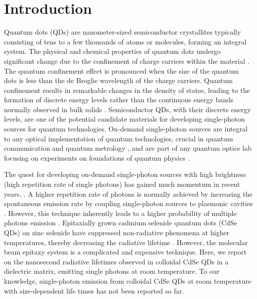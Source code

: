 \documentclass[%
 aip,
 amsmath,amssymb,
 reprint,%
]{revtex4-1}
\begin{document}
\section{\label{sec:level1}Introduction}
 Quantum dots (QDs) are nanometer-sized semiconductor crystallites typically consisting of tens to a few thousands of atoms or molecules,  forming an integral system. The physical \cite{CC, DD, EE} and chemical\cite{AA, BB} properties  of quantum dots undergo significant change due to the confinement of charge carriers within the material \cite{AAM}. The quantum confinement effect is pronounced when the size of the quantum dots is less than the de Broglie wavelength of the charge carriers. Quantum confinement results in remarkable changes in the density of states, leading to the formation of discrete energy levels rather than the continuous energy bands normally observed in bulk solids \cite{AAO}. Semiconductor QDs, with their discrete energy levels, are one of the potential candidate materials for developing single-photon sources for quantum technologies. On-demand single-photon sources are integral to any optical implementation of quantum technologies, crucial in quantum communication\cite{AAG} and quantum metrology \cite{AAH}, and are part of any quantum optics lab focusing on experiments on foundations of quantum physics \cite{AAI}.

The quest for developing on-demand single-photon sources with high brightness (high repetition rate of single photons) has gained much momentum in recent years. \cite{OO, XX}. A higher repetition rate of photons is normally achieved by increasing the spontaneous emission rate by coupling single-photon sources to plasmonic cavities \cite{PP}. However, this technique inherently leads to a higher probability of multiple photons emission \cite{QQ}.  Epitaxially grown cadmium selenide quantum dots (CdSe QDs) on zinc selenide have suppressed non-radiative phenomena at higher temperatures, thereby decreasing the radiative lifetime \cite{RR}. However, the molecular beam epitaxy system is a complicated and expensive technique. Here, we report on the nanosecond radiative lifetimes observed in colloidal CdSe QDs in a dielectric matrix, emitting single photons at room temperature. To our knowledge, single-photon emission from colloidal CdSe QDs at room temperature with size-dependent life times has not been reported so far.
\end{document}
